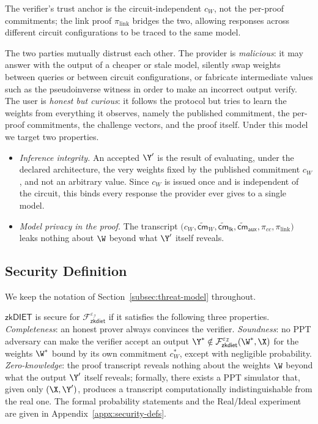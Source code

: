 \documentclass[runningheads]{llncs}
\begin{document}
The verifier's trust anchor is the circuit-independent $c_{W}$, not the per-proof commitments; the link proof $\pi_{\mathrm{link}}$ bridges the two, allowing responses across different circuit configurations to be traced to the same model.

 The two parties mutually distrust each other. The provider is \emph{malicious}: it may answer with the output of a cheaper or stale model, silently swap weights between queries or between circuit configurations, or fabricate intermediate values such as the pseudoinverse witness in order to make an incorrect output verify. The user is \emph{honest but curious}: it follows the protocol but tries to learn the weights from everything it observes, namely the published commitment, the per-proof commitments, the challenge vectors, and the proof itself. Under this model we target two properties.

\begin{itemize} [leftmargin=3mm, itemsep=2pt, topsep=2pt]
    \item \emph{Inference integrity.} An accepted $\Y'$ is the result of evaluating, under the declared architecture, the very weights fixed by the published commitment $c_{W}$, and not an arbitrary value. Since $c_{W}$ is issued once and is independent of the circuit, this binds every response the provider ever gives to a single model.
    \item \emph{Model privacy in the proof.} The transcript $\bigl(c_{W}, \widetilde{\mathsf{cm}}_{W}, \widetilde{\mathsf{cm}}_{\mathsf{lk}}, \widetilde{\mathsf{cm}}_{\mathsf{aux}}, \pi_{cc}, \pi_{\mathrm{link}}\bigr)$ leaks nothing about $\W$ beyond what $\Y'$ itself reveals.
\end{itemize}

\subsection{Security Definition}
\label{subsec:sec-def}

We keep the notation of Section~\ref{subsec:threat-model} throughout.

\begin{definition}
\label{def:zkdiet}
$\mathsf{zkDIET}$ is secure for $\mathcal{F}^{\varepsilon_\mathcal{I}}_{\mathsf{zkdiet}}$ if it satisfies the following three properties.
\emph{Completeness}: an honest prover always convinces the verifier.
\emph{Soundness}: no PPT adversary can make the verifier accept an output $\Y^{*}\notin\mathcal{F}^{\varepsilon_\mathcal{I}}_{\mathsf{zkdiet}}(\W^{*},\X)$ for the weights $\W^{*}$ bound by its own commitment $c_{W}^{*}$, except with negligible probability.
\emph{Zero-knowledge}: the proof transcript reveals nothing about the weights $\W$ beyond what the output $\Y'$ itself reveals; formally, there exists a PPT simulator that, given only $(\X,\Y')$, produces a transcript computationally indistinguishable from the real one.
The formal probability statements and the Real/Ideal experiment are given in Appendix~\ref{appx:security-defs}.
\end{definition}
\end{document}
